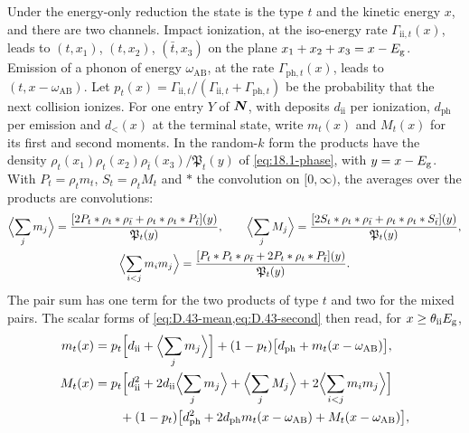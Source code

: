 Under the energy-only reduction the state is the type $t$ and the kinetic energy $x$, and there are two channels. Impact ionization, at the iso-energy rate $\varGamma_{\mathrm{ii},t}(x)$, leads to $(t, x_1)$, $(t, x_2)$, $(\bar t, x_3)$ on the plane $x_1 + x_2 + x_3 = x - E_{\mathrm{g}}$. Emission of a phonon of energy $\omega_{\mathrm{AB}}$, at the rate $\varGamma_{\mathrm{ph},t}(x)$, leads to $(t, x - \omega_{\mathrm{AB}})$. Let $p_t(x) = \varGamma_{\mathrm{ii},t}/(\varGamma_{\mathrm{ii},t} + \varGamma_{\mathrm{ph},t})$ be the probability that the next collision ionizes. For one entry $Y$ of $\bm{N}$, with deposits $d_{\mathrm{ii}}$ per ionization, $d_{\mathrm{ph}}$ per emission and $d_<(x)$ at the terminal state, write $m_t(x)$ and $M_t(x)$ for its first and second moments. In the random-$k$ form the products have the density $\rho_t(x_1)\rho_t(x_2)\rho_{\bar t}(x_3)/\mathfrak{P}_t(y)$ of \cref{eq:18.1-phase}, with $y = x - E_{\mathrm{g}}$. With $P_t = \rho_tm_t$, $S_t = \rho_tM_t$ and $*$ the convolution on $[0, \infty)$, the averages over the products are convolutions:
\begin{gather*}
  \Bigl\langle\sum_jm_j\Bigr\rangle = \frac{[2P_t*\rho_t*\rho_{\bar t} + \rho_t*\rho_t*P_{\bar t}](y)}{\mathfrak{P}_t(y)} , \qquad
  \Bigl\langle\sum_jM_j\Bigr\rangle = \frac{[2S_t*\rho_t*\rho_{\bar t} + \rho_t*\rho_t*S_{\bar t}](y)}{\mathfrak{P}_t(y)} , \\
  \Bigl\langle\sum_{i<j}m_im_j\Bigr\rangle = \frac{[P_t*P_t*\rho_{\bar t} + 2P_t*\rho_t*P_{\bar t}](y)}{\mathfrak{P}_t(y)} .
\end{gather*}
The pair sum has one term for the two products of type $t$ and two for the mixed pairs. The scalar forms of \cref{eq:D.43-mean,eq:D.43-second} then read, for $x \ge \theta_{\mathrm{ii}}E_{\mathrm{g}}$,
\begin{align}
  m_t(x) &= p_t\Bigl[d_{\mathrm{ii}} + \Bigl\langle\sum_jm_j\Bigr\rangle\Bigr] + (1 - p_t)\bigl[d_{\mathrm{ph}} + m_t(x - \omega_{\mathrm{AB}})\bigr] ,
  \label{eq:D.43-m1}\\
  M_t(x) &= p_t\Bigl[d_{\mathrm{ii}}^2 + 2d_{\mathrm{ii}}\Bigl\langle\sum_jm_j\Bigr\rangle + \Bigl\langle\sum_jM_j\Bigr\rangle + 2\Bigl\langle\sum_{i<j}m_im_j\Bigr\rangle\Bigr] \nonumber\\
  &\qquad + (1 - p_t)\bigl[d_{\mathrm{ph}}^2 + 2d_{\mathrm{ph}}m_t(x - \omega_{\mathrm{AB}}) + M_t(x - \omega_{\mathrm{AB}})\bigr] ,
  \label{eq:D.43-m2}
\end{align}
